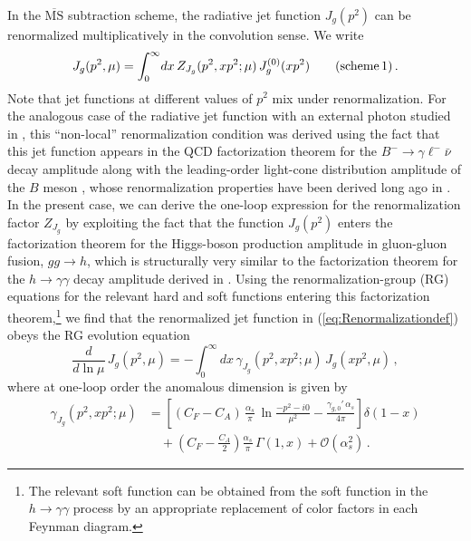 \documentclass[12pt]{article}
\numberwithin{equation}{section}
\begin{document}
In the $\overline{\text{MS}}$ subtraction scheme, the radiative jet function $J_g(p^2)$ can be renormalized multiplicatively in the convolution sense. We write
\begin{equation}\label{eq:Renormalizationdef}
   J_g(p^2,\mu) = \int_0^\infty\!dx\,Z_{J_g}(p^2,x p^2;\mu)\,J_g^{(0)}(x p^2) 
    \qquad \text{(scheme\,1)} \,.
\end{equation}
Note that jet functions at different values of $p^2$ mix under renormalization. For the analogous case of the radiative jet function with an external photon studied in \cite{Liu:2020ydl}, this ``non-local'' renormalization condition was derived using the fact that this jet function appears in the QCD factorization theorem for the $B^-\to\gamma\ell^-\bar\nu$ decay amplitude \cite{Bosch:2004th} along with the leading-order light-cone distribution amplitude of the $B$ meson \cite{Grozin:1996pq}, whose renormalization properties have been derived long ago in \cite{Lange:2003ff}. In the present case, we can derive the one-loop expression for the renormalization factor $Z_{J_g}$ by exploiting the fact that the function $J_g(p^2)$ enters the factorization theorem for the Higgs-boson production amplitude in gluon-gluon fusion, $gg\to h$, which is structurally very similar to the factorization theorem for the $h\to\gamma\gamma$ decay amplitude derived in \cite{Liu:2019oav,Liu:2020tzd,Liu:2020wbn}. Using the renormalization-group (RG) equations for the relevant hard and soft functions entering this factorization theorem,\footnote{The relevant soft function can be obtained from the soft function in the $h\to\gamma\gamma$ process \cite{Liu:2020eqe} by an appropriate replacement of color factors in each Feynman diagram.} 
we find that the renormalized jet function in (\ref{eq:Renormalizationdef}) obeys the RG evolution equation \cite{HiggsGluGlu}
\begin{equation}\label{eq:rge}
   \frac{d}{d\ln\mu}\,J_g(p^2,\mu)
   = - \int_0^\infty\!dx\,\gamma_{J_g}(p^2,x p^2;\mu)\,J_g(x p^2,\mu) \,,
\end{equation}
where at one-loop order the anomalous dimension is given by
\begin{equation}\label{eq:gammaJg}
\begin{aligned}
   \gamma_{J_g}(p^2,x p^2;\mu)
   &= \left[ (C_F-C_A)\,\frac{\alpha_s}{\pi}\,\ln\frac{-p^2-i0}{\mu^2} 
    - \frac{\gamma_{g,0}'\,\alpha_s}{4\pi} \right] \delta(1-x) \\
   &\quad + \left( C_F - \frac{C_A}{2} \right) \frac{\alpha_s}{\pi}\,\Gamma(1,x) + \mathcal{O}(\alpha_s^2) \,.
\end{aligned}
\end{equation}
\end{document}

